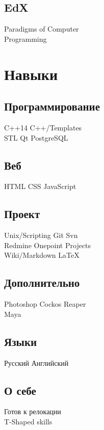 \documentclass[a4paper]{curricula-vitae}
\begin{document}
\begin{minipage}[t]{0.33\textwidth}
\insertspace

\subsection{EdX}
Paradigms of Computer \\
Programming

\insertspace

\section{Навыки}

\subsection{Программирование}
C++14 \textbullet{} C++/Templates \\
STL \textbullet{} Qt \textbullet{} PostgreSQL


\insertspace

\subsection{Веб}
HTML \textbullet{} CSS \textbullet{} JavaScript

\insertspace

\subsection{Проект}
Unix/Scripting \textbullet{} Git \textbullet{} Svn \\
Redmine \textbullet{} Onepoint Projects \\
Wiki/Markdown \textbullet{} \LaTeX

\insertspace

\subsection{Дополнительно}
Photoshop \textbullet{} Cockos Reaper \\
Maya

\insertspace

\subsection{Языки}
Русский \textbullet{} Английский

\insertspace

\subsection{О себе}
Готов к релокации \\
T-Shaped skills

\insertspace

\end{minipage} %
\end{document}
